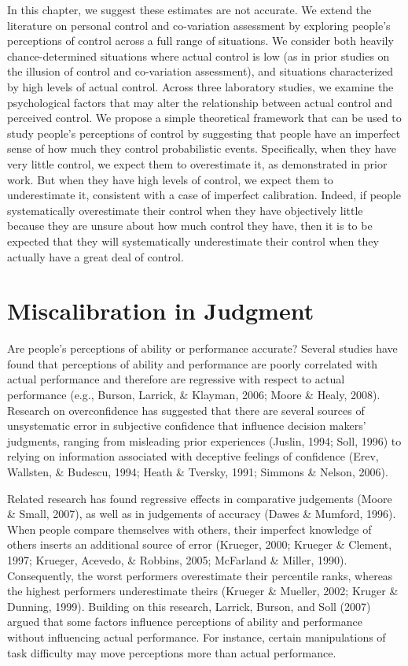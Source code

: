 \documentclass[USenglish,letterpaper,12pt,extrafontsizes,oneside,onecolumn,final]{memoir}
\begin{document}
In this chapter, we suggest these estimates are not accurate. We extend the literature on personal control and co-variation assessment by exploring people's perceptions of control across a full range of situations. We consider both heavily chance-determined situations where actual control is low (as in prior studies on the illusion of control and co-variation assessment), and situations characterized by high levels of actual control. Across three laboratory studies, we examine the psychological factors that may alter the relationship between actual control and perceived control. We propose a simple theoretical framework that can be used to study people's perceptions of control by suggesting that people have an imperfect sense of how much they control probabilistic events. Specifically, when they have very little control, we expect them to overestimate it, as demonstrated in prior work. But when they have high levels of control, we expect them to underestimate it, consistent with a case of imperfect calibration. Indeed, if people systematically overestimate their control when they have objectively little because they are unsure about how much control they have, then it is to be expected that they will systematically underestimate their control when they actually have a great deal of control. 

\section{Miscalibration in Judgment}
Are people's perceptions of ability or performance accurate? Several studies have found that perceptions of ability and performance are poorly correlated with actual performance and therefore are regressive with respect to actual performance (e.g., Burson, Larrick, \& Klayman, 2006; Moore \& Healy, 2008). Research on overconfidence has suggested that there are several sources of unsystematic error in subjective confidence that influence decision makers' judgments, ranging from misleading prior experiences (Juslin, 1994; Soll, 1996) to relying on information associated with deceptive feelings of confidence (Erev, Wallsten, \& Budescu, 1994; Heath \& Tversky, 1991; Simmons \& Nelson, 2006). 

Related research has found regressive effects in comparative judgements (Moore \& Small, 2007), as well as in judgements of accuracy (Dawes \& Mumford, 1996). When people compare themselves with others, their imperfect knowledge of others inserts an additional source of error (Krueger, 2000; Krueger \& Clement, 1997; Krueger, Acevedo, \& Robbins, 2005; McFarland \& Miller, 1990). Consequently, the worst performers overestimate their percentile ranks, whereas the highest performers underestimate theirs (Krueger \& Mueller, 2002; Kruger \& Dunning, 1999). Building on this research, Larrick, Burson, and Soll (2007) argued that some factors influence perceptions of ability and performance without influencing actual performance. For instance, certain manipulations of task difficulty may move perceptions more than actual performance.
\end{document}
